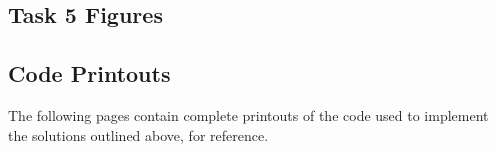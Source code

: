 \documentclass[conference]{IEEEtran}
\begin{document}
\subsection{Task 5 Figures}\label{app:T5}

\subsection{Code Printouts}
The following pages contain complete printouts of the code used to implement the solutions outlined above, for reference.

%
%
\end{document}
